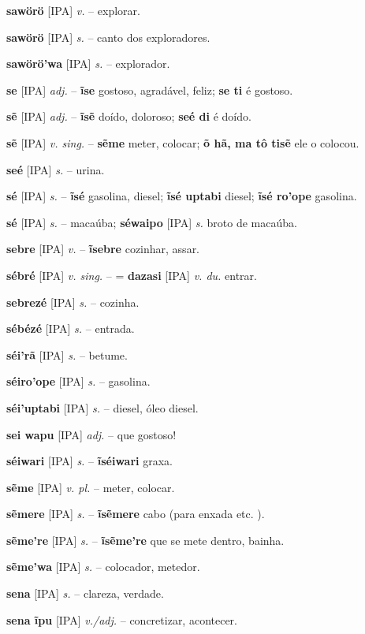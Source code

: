 \textbf{sawörö} [IPA] \textit{v.} -- explorar.

\textbf{sawörö} [IPA] \textit{s.} -- canto dos exploradores.

\textbf{sawörö'wa} [IPA] \textit{s.} -- explorador.

\textbf{se} [IPA] \textit{adj.} -- \textbf{ĩse} gostoso, agradável, feliz; \textbf{se ti} é gostoso.

\textbf{sẽ} [IPA] \textit{adj.} -- \textbf{ĩsẽ} doído, doloroso; \textbf{seé di} é doído.

\textbf{sẽ} [IPA] \textit{v. sing.} -- \textbf{sẽme} meter, colocar; \textbf{õ hã, ma tô tisẽ} ele o colocou.

\textbf{seé} [IPA] \textit{s.} -- urina.

\textbf{sé} [IPA] \textit{s.} -- \textbf{ĩsé} gasolina, diesel; \textbf{ĩsé uptabi} diesel; \textbf{ĩsé ro'ope} gasolina.

\textbf{sé} [IPA] \textit{s.} -- macaúba; \textbf{séwaipo} [IPA] \textit{s.} broto de macaúba.

\textbf{sebre} [IPA] \textit{v.} -- \textbf{ĩsebre} cozinhar, assar.

\textbf{sébré} [IPA] \textit{v. sing.} -- = \textbf{dazasi} [IPA] \textit{v. du.} entrar.

\textbf{sebrezé} [IPA] \textit{s.} -- cozinha.

\textbf{sébézé} [IPA] \textit{s.} -- entrada.

\textbf{séi'rã} [IPA] \textit{s.} -- betume.

\textbf{séiro'ope} [IPA] \textit{s.} -- gasolina.

\textbf{séi'uptabi} [IPA] \textit{s.} -- diesel, óleo diesel.

\textbf{sei wapu} [IPA] \textit{adj.} -- que gostoso!

\textbf{séiwari} [IPA] \textit{s.} -- \textbf{ĩséiwari} graxa.

\textbf{sẽme} [IPA] \textit{v. pl.} -- meter, colocar.

\textbf{sẽmere} [IPA] \textit{s.} -- \textbf{ĩsẽmere} cabo (para enxada etc. ).

\textbf{sẽme're} [IPA] \textit{s.} -- \textbf{ĩsẽme're} que se mete dentro, bainha.

\textbf{sẽme'wa} [IPA] \textit{s.} -- colocador, metedor.

\textbf{sena} [IPA] \textit{s.} -- clareza, verdade.

\textbf{sena ĩpu} [IPA] \textit{v./adj.} -- concretizar, acontecer.

